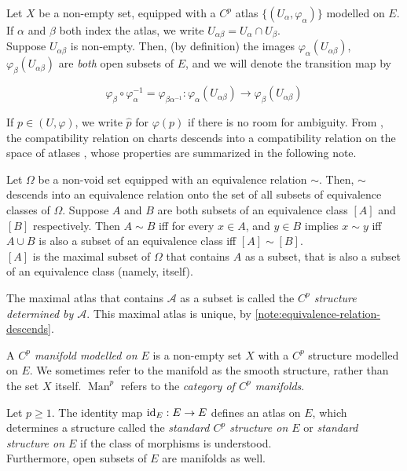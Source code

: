 \documentclass[../main-manifolds.tex]{subfiles}
\begin{document}
Let $X$ be a non-empty set, equipped with a $C^p$ atlas $\{(U_\alpha,\varphi_\alpha)\}$ modelled on $E$. If $\alpha$ and $\beta$ both index the atlas, we write  $U_{\alpha\beta} = U_{\alpha}\cap U_{\beta}$.\\

Suppose $U_{\alpha\beta}$ is non-empty. Then, (by definition) the images $\varphi_{\alpha}(U_{\alpha\beta})$, $\varphi_{\beta}(U_{\alpha\beta})$ are \emph{both} open subsets of $E$, and we will denote the transition map by

\begin{equation}\label{def-transition-map}
    \varphi_{\beta}\circ\varphi_{\alpha}^{-1}=\varphi_{\beta\alpha^{-1}}: \varphi_{\alpha}(U_{\alpha\beta})\to\varphi_{\beta}(U_{\alpha\beta})
\end{equation}

If $p\in (U,\varphi)$, we write $\hat{p}$ for $\varphi(p)$ if there is no room for ambiguity. From , the compatibility relation on charts descends into a compatibility relation on the space of atlases , whose properties are summarized in the following note.

\begin{note}\label{note:equivalence-relation-descends}
    Let $\Omega$ be a non-void set equipped with an equivalence relation $\sim$. Then, $\sim$ descends into an equivalence relation onto the set of all subsets of equivalence classes of $\Omega$. Suppose $A$ and $B$ are both subsets of an equivalence class $[A]$ and $[B]$ respectively. Then $A\sim B$ iff for every $x\in A$, and $y\in B$ implies $x\sim y$ iff $A\cup B$ is also a subset of an equivalence class iff $[A]\sim[B]$.\\

    $[A]$ is the maximal subset of $\Omega$ that contains $A$ as a subset, that is also a subset of an equivalence class (namely, itself).
\end{note}

\begin{definition}
    The maximal atlas that contains $\mathcal{A}$ as a subset is called the \emph{$C^p$ structure determined by $\mathcal{A}$}. This maximal atlas is unique, by \cref{note:equivalence-relation-descends}.
\end{definition}
\begin{definition}[Manifold]
    A \emph{$C^p$ manifold modelled on $E$} is a non-empty set $X$ with a $C^p$ structure modelled on $E$. We sometimes refer to the manifold as the smooth structure, rather than the set $X$ itself. $\operatorname{Man}^p$ refers to the \emph{category of $C^p$ manifolds}.
\end{definition}
\begin{wts}[$E$ is a manifold]
    Let $p\geq 1$. The identity map $\operatorname{id}_{E}: E\to E$ defines an atlas on $E$, which determines a structure called the \emph{standard $C^p$ structure on $E$} or \emph{standard structure on $E$} if the class of morphisms is understood.\\

    Furthermore, open subsets of $E$ are manifolds as well.
\end{wts}
\end{document}
